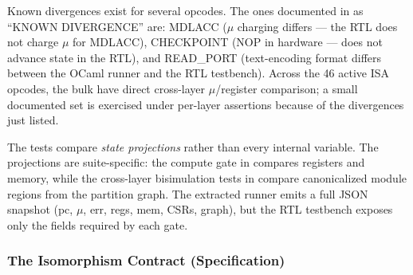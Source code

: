 Known divergences exist for several opcodes. The ones documented in  as ``KNOWN DIVERGENCE'' are: MDLACC ($\mu$ charging differs --- the RTL does not charge $\mu$ for MDLACC), CHECKPOINT (NOP in hardware --- does not advance state in the RTL), and READ\_PORT (text-encoding format differs between the OCaml runner and the RTL testbench). Across the 46 active ISA opcodes, the bulk have direct cross-layer $\mu$/register comparison; a small documented set is exercised under per-layer assertions because of the divergences just listed.

The tests compare \textit{state projections} rather than every internal variable. The projections are suite-specific: the compute gate in  compares registers and memory, while the cross-layer bisimulation tests in  compare canonicalized module regions from the partition graph. The extracted runner emits a full JSON snapshot (pc, $\mu$, err, regs, mem, CSRs, graph), but the RTL testbench exposes only the fields required by each gate.

\subsubsection{The Isomorphism Contract (Specification)}

